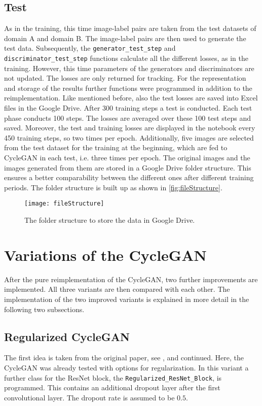 \documentclass[fleqn,10pt]{SelfArx} %
\begin{document}
\subsection{Test}
As in the training, this time image-label pairs are taken from the test datasets of domain A and domain B. The image-label pairs are then used to generate the test data. Subsequently, the \texttt{generator\-\_test\-\_step} and \texttt{dis\-crimi\-nator\-\_test\-\_step} functions calculate all the different losses, as in the training. However, this time parameters of the generators and discriminators are not updated. The losses are only returned for tracking.
For the representation and storage of the results further functions were programmed in addition to the reimplementation. Like mentioned before, also the test losses are saved into Excel files in the Google Drive. After 300 training steps a test is conducted. Each test phase conducts 100 steps. The losses are averaged over these 100 test steps and saved. Moreover, the test and training losses are displayed in the notebook every 450 training steps, so two times per epoch. Additionally, five images are selected from the test dataset for the training at the beginning, which are fed to Cycle\ac{GAN} in each test, i.e. three times per epoch. The original images and the images generated from them are stored in a Google Drive folder structure. This ensures a better comparability between the different ones after different training periods. The folder structure is built up as shown in \autoref{fig:fileStructure}.

\begin{figure}[htb] 
	\centering 
	\texttt{[image: fileStructure]}
	\caption{The folder structure to store the data in Google Drive.}
	\label{fig:fileStructure}
\end{figure}

\section{Variations of the Cycle\ac{GAN}}
After the pure reimplementation of the Cycle\ac{GAN}, two further improvements are implemented. All three variants are then compared with each other. The implementation of the two improved variants is explained in more detail in the following two subsections.

\subsection{Regularized CycleGAN}
The first idea is taken from the original paper, see \cite{image-to-image-ccan}, and continued. Here, the Cycle\ac{GAN} was already tested with options for regularization. In this variant a further class for the \ac{ResNet} block, the \texttt{Regularized\_ResNet\_Block}, is programmed. This contains an additional dropout layer after the first convolutional layer. The dropout rate is assumed to be $0.5$.
\end{document}
